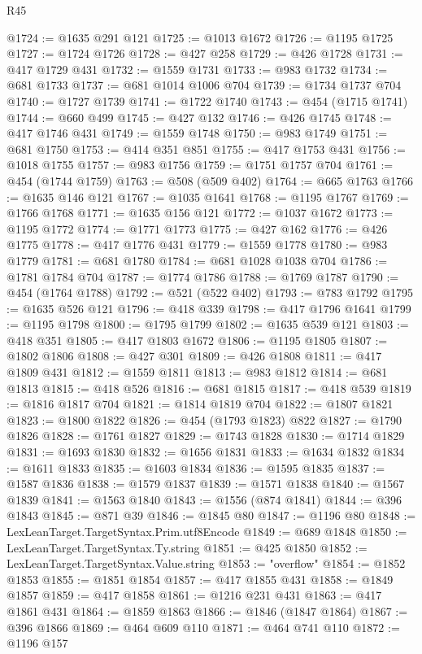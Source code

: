 \begin{lexlean}{R45}
\begin{coremodule}
@1724 := @1635 @291 @121
@1725 := @1013 @1672
@1726 := @1195 @1725
@1727 := @1724 @1726
@1728 := @427 @258
@1729 := @426 @1728
@1731 := @417 @1729 @431
@1732 := @1559 @1731
@1733 := @983 @1732
@1734 := @681 @1733
@1737 := @681 @1014 @1006 @704
@1739 := @1734 @1737 @704
@1740 := @1727 @1739
@1741 := @1722 @1740
@1743 := @454 (@1715 @1741)
@1744 := @660 @499
@1745 := @427 @132
@1746 := @426 @1745
@1748 := @417 @1746 @431
@1749 := @1559 @1748
@1750 := @983 @1749
@1751 := @681 @1750
@1753 := @414 @351 @851
@1755 := @417 @1753 @431
@1756 := @1018 @1755
@1757 := @983 @1756
@1759 := @1751 @1757 @704
@1761 := @454 (@1744 @1759)
@1763 := @508 (@509 @402)
@1764 := @665 @1763
@1766 := @1635 @146 @121
@1767 := @1035 @1641
@1768 := @1195 @1767
@1769 := @1766 @1768
@1771 := @1635 @156 @121
@1772 := @1037 @1672
@1773 := @1195 @1772
@1774 := @1771 @1773
@1775 := @427 @162
@1776 := @426 @1775
@1778 := @417 @1776 @431
@1779 := @1559 @1778
@1780 := @983 @1779
@1781 := @681 @1780
@1784 := @681 @1028 @1038 @704
@1786 := @1781 @1784 @704
@1787 := @1774 @1786
@1788 := @1769 @1787
@1790 := @454 (@1764 @1788)
@1792 := @521 (@522 @402)
@1793 := @783 @1792
@1795 := @1635 @526 @121
@1796 := @418 @339
@1798 := @417 @1796 @1641
@1799 := @1195 @1798
@1800 := @1795 @1799
@1802 := @1635 @539 @121
@1803 := @418 @351
@1805 := @417 @1803 @1672
@1806 := @1195 @1805
@1807 := @1802 @1806
@1808 := @427 @301
@1809 := @426 @1808
@1811 := @417 @1809 @431
@1812 := @1559 @1811
@1813 := @983 @1812
@1814 := @681 @1813
@1815 := @418 @526
@1816 := @681 @1815
@1817 := @418 @539
@1819 := @1816 @1817 @704
@1821 := @1814 @1819 @704
@1822 := @1807 @1821
@1823 := @1800 @1822
@1826 := @454 (@1793 @1823) @822
@1827 := @1790 @1826
@1828 := @1761 @1827
@1829 := @1743 @1828
@1830 := @1714 @1829
@1831 := @1693 @1830
@1832 := @1656 @1831
@1833 := @1634 @1832
@1834 := @1611 @1833
@1835 := @1603 @1834
@1836 := @1595 @1835
@1837 := @1587 @1836
@1838 := @1579 @1837
@1839 := @1571 @1838
@1840 := @1567 @1839
@1841 := @1563 @1840
@1843 := @1556 (@874 @1841)
@1844 := @396 @1843
@1845 := @871 @39
@1846 := @1845 @80
@1847 := @1196 @80
@1848 := LexLeanTarget.TargetSyntax.Prim.utf8Encode
@1849 := @689 @1848
@1850 := LexLeanTarget.TargetSyntax.Ty.string
@1851 := @425 @1850
@1852 := LexLeanTarget.TargetSyntax.Value.string
@1853 := "overflow"
@1854 := @1852 @1853
@1855 := @1851 @1854
@1857 := @417 @1855 @431
@1858 := @1849 @1857
@1859 := @417 @1858
@1861 := @1216 @231 @431
@1863 := @417 @1861 @431
@1864 := @1859 @1863
@1866 := @1846 (@1847 @1864)
@1867 := @396 @1866
@1869 := @464 @609 @110
@1871 := @464 @741 @110
@1872 := @1196 @157

\end{coremodule}
\end{lexlean}
